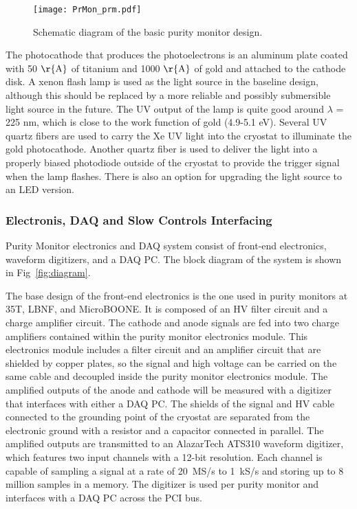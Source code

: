 \begin{figure}[h]
\centering
\texttt{[image: PrMon\_prm.pdf]}
\caption{Schematic diagram of the basic purity monitor design.}\label{fig:prm}
\end{figure}

The photocathode that produces the photoelectrons is an aluminum plate coated with 50 $\rm\r{A}$ of titanium and 1000 $\rm\r{A}$ of gold and attached to the cathode disk. A xenon flash lamp is used as the light source in the baseline design, although this should be replaced by a more reliable and possibly submersible light source in the future. The UV output of the lamp is quite good around $\lambda$ = 225 nm, which is close to the work function of gold (4.9-5.1 eV). Several UV quartz fibers are used to carry the Xe UV light into the cryostat to illuminate the gold photocathode. 
Another quartz fiber is used to deliver the light into a properly biased photodiode outside of the cryostat to provide the trigger signal when the lamp flashes. There is also an option for upgrading the light source to an LED version.

\subsubsection{Electronis, DAQ and Slow Controls Interfacing}
Purity Monitor electronics and DAQ system consist of front-end electronics, waveform digitizers, and a DAQ PC.   The block diagram of the system is shown in Fig~\ref{fig:diagram}. 

The base design of the front-end electronics is the one used in purity monitors at 35T, LBNF, and MicroBOONE. It is composed of an HV filter circuit and a charge amplifier circuit. The cathode and anode signals are fed into two charge amplifiers contained within the purity monitor electronics module. This electronics module includes a filter circuit and an amplifier circuit that are shielded by copper plates, so the signal and high voltage can be carried on the same cable and decoupled inside the purity monitor electronics module. The amplified outputs of the anode and cathode will be measured with a digitizer that interfaces with either a DAQ PC. The shields of the signal and HV cable connected to the grounding point of the cryostat are separated from the electronic ground with a resistor and a capacitor connected in parallel. The amplified outputs are transmitted to an AlazarTech ATS310 waveform digitizer, which features two input channels with a 12-bit resolution. Each channel is capable of sampling a signal at a rate of 20~MS/s to 1~kS/s and storing up to 8 million samples in a memory. The digitizer is used per purity monitor and interfaces with a DAQ PC across the PCI bus.

